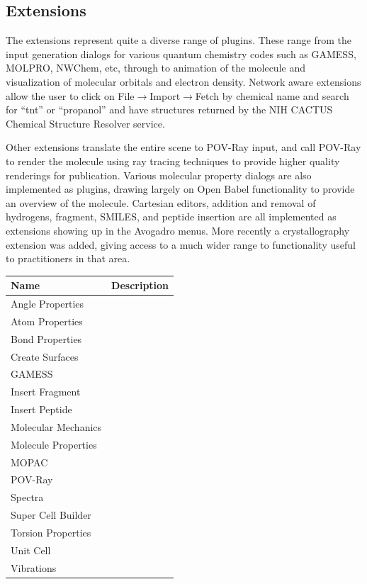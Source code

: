 \documentclass[10pt]{bmc_article}
\newenvironment{bmcformat}{\begin{raggedright}
\baselineskip20pt\sloppy\setboolean{publ}{false}}{\end{raggedright}
\baselineskip20pt\sloppy}
\begin{document}
\begin{bmcformat}
\subsection{Extensions}

The extensions represent quite a diverse range of plugins. These range from the
input generation dialogs for various quantum chemistry codes such as GAMESS,
MOLPRO, NWChem, etc, through to animation of the molecule and visualization of
molecular orbitals and electron density. Network aware extensions allow the user
to click on File$\to$Import$\to$Fetch by chemical name and search for ``tnt'' or
``propanol'' and have structures returned by the NIH CACTUS Chemical Structure
Resolver service.

Other extensions translate the entire scene to POV-Ray input, and call POV-Ray
to render the molecule using ray tracing techniques to provide higher quality
renderings for publication. Various molecular property dialogs are also
implemented as plugins, drawing largely on Open Babel functionality to provide
an overview of the molecule. Cartesian editors, addition and removal of
hydrogens, fragment, SMILES, and peptide insertion are all implemented as
extensions showing up in the Avogadro menus. More recently a crystallography
extension was added, giving access to a much wider range to functionality
useful to practitioners in that area.

\begin{tabular}{l | l}
\hline
Name & Description \\
\hline
Angle Properties & \\
Atom Properties & \\
Bond Properties & \\
Create Surfaces & \\
GAMESS & \\
Insert Fragment & \\
Insert Peptide & \\
Molecular Mechanics & \\
Molecule Properties & \\
MOPAC & \\
POV-Ray & \\
Spectra & \\
Super Cell Builder & \\
Torsion Properties & \\
Unit Cell & \\
Vibrations & \\
\hline
\end{tabular}


\end{bmcformat}
\end{document}

